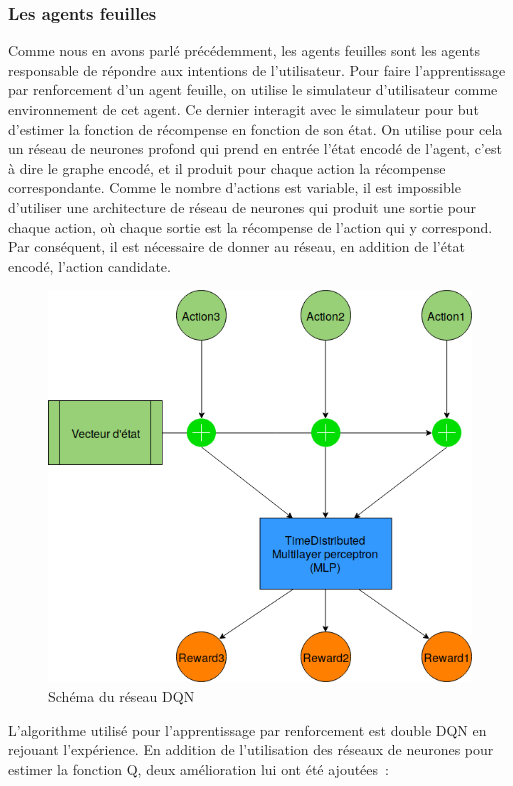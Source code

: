 \subsubsection*{Les agents feuilles}
Comme nous en avons parlé précédemment, les agents feuilles sont les agents responsable de répondre aux intentions de l’utilisateur. Pour faire l’apprentissage par renforcement d’un agent feuille, on utilise le simulateur d’utilisateur comme environnement de cet agent. Ce dernier interagit avec le simulateur pour but d’estimer la fonction de récompense en fonction de son état. On utilise pour cela un réseau de neurones profond qui prend en entrée l’état encodé de l’agent, c’est à dire le graphe encodé, et il produit pour chaque action la récompense correspondante. Comme le nombre d’actions est variable, il est impossible d’utiliser une architecture de réseau de neurones qui produit une sortie pour chaque action, où chaque sortie est la récompense de l’action qui y correspond. Par conséquent, il est nécessaire de donner au réseau, en addition de l’état encodé, l’action candidate.
\begin{figure}[H] 
	\centering
	\includegraphics[width=0.7\linewidth]{images/Conception/DM/time_dist.png}
	\caption{Schéma du réseau DQN}
\end{figure}\label{time_dist}
L’algorithme utilisé pour l’apprentissage par renforcement est double DQN en rejouant l’expérience. En addition de l’utilisation des réseaux de neurones pour estimer la fonction Q, deux amélioration lui ont été ajoutées :
